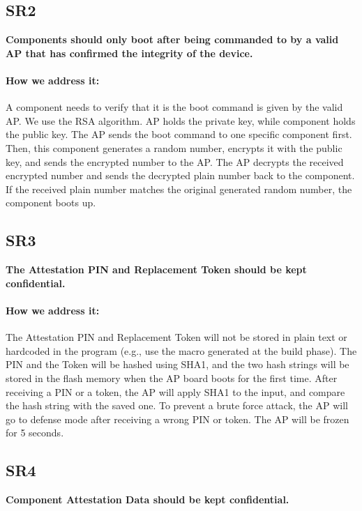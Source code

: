 \documentclass[11pt,oneside,onecolumn,letterpaper]{article}
\newcounter{alg}
\begin{document}
\subsection{SR2}
\textbf{Components should only boot after being commanded to by a valid AP that has confirmed the integrity of the device.}
\paragraph{How we address it:}
A component needs to verify that it is the boot command is given by the valid AP.
We use the RSA algorithm.
AP holds the private key,
while component holds the public key.
The AP sends the boot command to one specific component first.
Then,
this component generates a random number,
encrypts it with the public key,
and sends the encrypted number to the AP.
The AP decrypts the received encrypted number and sends the decrypted plain number back to the component.
If the received plain number matches the original generated random number,
the component boots up.

\subsection{SR3}
\textbf{The Attestation PIN and Replacement Token should be kept confidential.}
\paragraph{How we address it:}
The Attestation PIN and Replacement Token will not be stored in plain text or hardcoded in the program (e.g., use the macro generated at the build phase).
The PIN and the Token will be hashed using SHA1,
and the two hash strings will be stored in the flash memory when the AP board boots for the first time.
After receiving a PIN or a token,
the AP will apply SHA1 to the input,
and compare the hash string with the saved one.
To prevent a brute force attack,
the AP will go to defense mode after receiving a wrong PIN or token.
The AP will be frozen for 5 seconds.

\subsection{SR4}
\textbf{Component Attestation Data should be kept confidential.}
\end{document}
